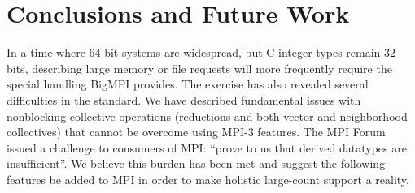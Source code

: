 
\section{Conclusions and Future Work}

In a time where 64 bit systems are widespread,
but C integer types remain 32 bits, describing large memory or file requests
will more frequently require the special handling BigMPI provides.  The
exercise has also revealed several difficulties in the standard.
We have described fundamental issues with nonblocking
collective operations (reductions and both vector and neighborhood collectives)
that cannot be overcome using MPI-3 features.
The MPI Forum issued a challenge to consumers of MPI:
``prove to us that derived datatypes are insufficient''.
We believe this burden has been met and suggest the following features
be added to MPI in order to make holistic large-count support a reality.


%
